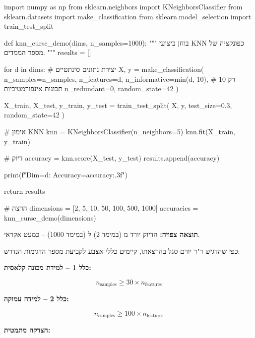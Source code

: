 \begin{pythonbox}
import numpy as np
from sklearn.neighbors import KNeighborsClassifier
from sklearn.datasets import make_classification
from sklearn.model_selection import train_test_split

def knn_curse_demo(dims, n_samples=1000):
    """
    בוחן ביצועי KNN כפונקציה של מספר הממדים.
    """
    results = []
    
    for d in dims:
        # יצירת נתונים סינתטיים
        X, y = make_classification(
            n_samples=n_samples,
            n_features=d,
            n_informative=min(d, 10),  # רק 10 תכונות אינפורמטיביות
            n_redundant=0,
            random_state=42
        )
        
        X_train, X_test, y_train, y_test = train_test_split(
            X, y, test_size=0.3, random_state=42
        )
        
        # אימון KNN
        knn = KNeighborsClassifier(n_neighbors=5)
        knn.fit(X_train, y_train)
        
        # דיוק
        accuracy = knn.score(X_test, y_test)
        results.append(accuracy)
        
        print(f"Dim={d}: Accuracy={accuracy:.3f}")
    
    return results

# הרצה
dimensions = [2, 5, 10, 50, 100, 500, 1000]
accuracies = knn_curse_demo(dimensions)
\end{pythonbox}

\textbf{תוצאה צפויה:} הדיוק יורד מ\en{-} (במימד \num{2}) ל\en{-} (במימד \num{1000}) – כמעט אקראי.


כפי שהדגיש ד"ר יורם סגל בהרצאתו, קיימים כללי אצבע לקביעת מספר הדגימות הנדרש:

\textbf{כלל \num{1} – למידת מכונה קלאסית:}

\begin{equation}
n_{\text{samples}} \geq \num{30} \times n_{\text{features}}
\end{equation}

\textbf{כלל \num{2} – למידה עמוקה:}

\begin{equation}
n_{\text{samples}} \geq \num{100} \times n_{\text{features}}
\end{equation}

\textbf{הצדקה מתמטית:}

